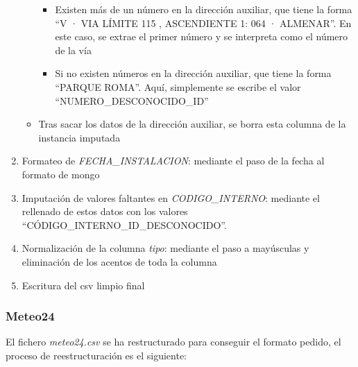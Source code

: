 \documentclass[]{article}
\begin{document}
\begin{enumerate}
\begin{itemize}
\begin{itemize}
            \item Existen más de un número en la dirección auxiliar, que tiene la forma ``V · VIA LÍMITE 115 , ASCENDIENTE 1: 064 · ALMENAR''. En este caso, se extrae el primer número y se interpreta como el número de la vía
            \item Si no existen números en la dirección auxiliar, que tiene la forma ``PARQUE ROMA''. Aquí, simplemente se escribe el valor ``NUMERO\_DESCONOCIDO\_ID''
        \end{itemize}
        \item Tras sacar los datos de la dirección auxiliar, se borra esta columna de la instancia imputada
    \end{itemize}
    \item Formateo de \textit{FECHA\_INSTALACION}: mediante el paso de la fecha al formato de mongo
    \item Imputación de valores faltantes en \textit{CODIGO\_INTERNO}: mediante el rellenado de estos datos con los valores ``CÓDIGO\_INTERNO\_ID\_DESCONOCIDO''.
    \item Normalización de la columna \textit{tipo}: mediante el paso a mayúsculas y eliminación de los acentos de toda la columna
    \item Escritura del csv limpio final
\end{enumerate}

\subsubsection{Meteo24}
\label{subsubsec:preprocessmeteo}
El fichero \textit{meteo24.csv} se ha restructurado para conseguir el formato pedido, el proceso de reestructuración es el siguiente:
\end{document}
